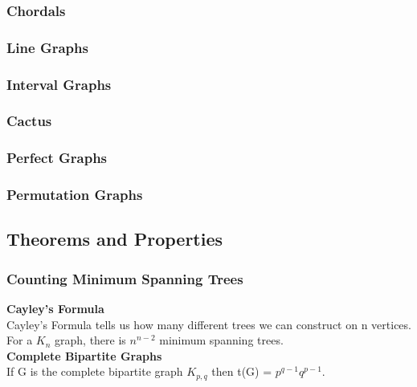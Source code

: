 \documentclass[10pt, twocolumn]{article}
\begin{document}
\begin{flushleft}
\subsubsection{Chordals}

\subsubsection{Line Graphs}

\subsubsection{Interval Graphs}

\subsubsection{Cactus}

\subsubsection{Perfect Graphs}

\subsubsection{Permutation Graphs}

\subsection{Theorems and Properties}
\subsubsection{Counting Minimum Spanning Trees}
\textbf{Cayley's Formula}\\
Cayley’s Formula tells us how many different trees we can construct on n vertices.
For a $K_n$ graph, there is $n^{n-2}$ minimum spanning trees.\\[0.2cm]

\textbf{Complete Bipartite Graphs}\\
If G is the complete bipartite graph $K_{p,q}$ then t(G) = $p^{q-1}q^{p-1}$.\\[0.2cm]



\end{flushleft}
\end{document}
